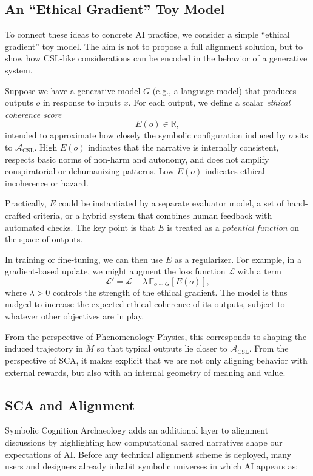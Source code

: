\documentclass[12]{amsart}
\theoremstyle{plain}
\begin{document}
\subsection{An ``Ethical Gradient'' Toy Model}

To connect these ideas to concrete AI practice, we consider a simple ``ethical gradient'' toy model. The aim is not to propose a full alignment solution, but to show how CSL-like considerations can be encoded in the behavior of a generative system.

Suppose we have a generative model $G$ (e.g., a language model) that produces outputs $o$ in response to inputs $x$. For each output, we define a scalar \emph{ethical coherence score}
\[
  E(o) \in \mathbb{R},
\]
intended to approximate how closely the symbolic configuration induced by $o$ sits to $\mathcal{A}_{\mathrm{CSL}}$. High $E(o)$ indicates that the narrative is internally consistent, respects basic norms of non-harm and autonomy, and does not amplify conspiratorial or dehumanizing patterns. Low $E(o)$ indicates ethical incoherence or hazard.

Practically, $E$ could be instantiated by a separate evaluator model, a set of hand-crafted criteria, or a hybrid system that combines human feedback with automated checks. The key point is that $E$ is treated as a \emph{potential function} on the space of outputs.

In training or fine-tuning, we can then use $E$ as a regularizer. For example, in a gradient-based update, we might augment the loss function $\mathcal{L}$ with a term
\[
  \mathcal{L}' = \mathcal{L} - \lambda\, \mathbb{E}_{o \sim G} [E(o)],
\]
where $\lambda > 0$ controls the strength of the ethical gradient. The model is thus nudged to increase the expected ethical coherence of its outputs, subject to whatever other objectives are in play.

From the perspective of Phenomenology Physics, this corresponds to shaping the induced trajectory in $\tilde M$ so that typical outputs lie closer to $\mathcal{A}_{\mathrm{CSL}}$. From the perspective of SCA, it makes explicit that we are not only aligning behavior with external rewards, but also with an internal geometry of meaning and value.

\subsection{SCA and Alignment}

Symbolic Cognition Archaeology adds an additional layer to alignment discussions by highlighting how computational sacred narratives shape our expectations of AI. Before any technical alignment scheme is deployed, many users and designers already inhabit symbolic universes in which AI appears as:
\end{document}
